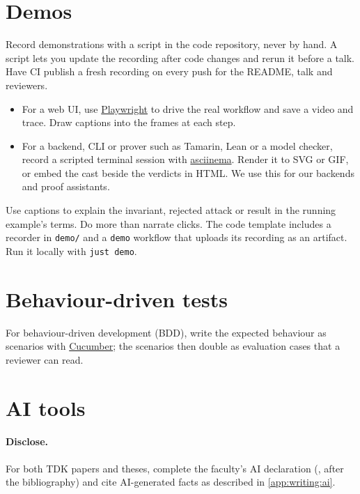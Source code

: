 \section{Demos}\label{app:code:demo}
Record demonstrations with a script in the code repository, never by hand. A script lets you update the recording after code changes and rerun it before a talk. Have CI publish a fresh recording on every push for the README, talk and reviewers.
\begin{itemize}[noitemsep]
  \item For a web UI, use \href{https://playwright.dev/}{Playwright} to drive the real workflow and save a video and trace. Draw captions into the frames at each step.
  \item For a backend, CLI or prover such as Tamarin, Lean or a model checker, record a scripted terminal session with \href{https://asciinema.org/}{asciinema}. Render it to SVG or GIF, or embed the cast beside the verdicts in HTML. We use this for our backends and proof assistants.
\end{itemize}
Use captions to explain the invariant, rejected attack or result in the running example's terms. Do more than narrate clicks. The code template includes a recorder in \texttt{demo/} and a \texttt{demo} workflow that uploads its recording as an artifact. Run it locally with \texttt{just demo}.

\section{Behaviour-driven tests}
For behaviour-driven development (BDD), write the expected behaviour as scenarios with \href{https://cucumber.io/}{Cucumber}; the scenarios then double as evaluation cases that a reviewer can read.

\section{AI tools}\label{app:code:ai}
\paragraph{Disclose.} For both TDK papers and theses, complete the faculty's AI declaration (, after the bibliography) and cite AI-generated facts as described in \cref{app:writing:ai}.

